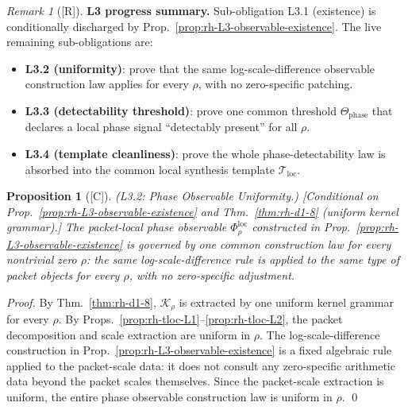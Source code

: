 \documentclass[12pt,oneside]{amsbook}
\theoremstyle{plain}
\newtheorem{proposition}[theorem]{Proposition}
\theoremstyle{definition}
\theoremstyle{remark}
\newtheorem{remark}[theorem]{Remark}
\newcommand{\status}[1]{\textup{[#1]}}
\begin{document}
\begin{remark}[\status{R}]\label{rem:rh-L3-progress}
\textbf{L3 progress summary.}
Sub-obligation L3.1 (existence) is conditionally discharged by
Prop.~\ref{prop:rh-L3-observable-existence}. The live remaining
sub-obligations are:
\begin{itemize}
 \item \textbf{L3.2 (uniformity)}: prove that the same
 log-scale-difference observable construction law applies for
 every $\rho$, with no zero-specific patching.
 \item \textbf{L3.3 (detectability threshold)}: prove one common
 threshold $\Theta_{\mathrm{phase}}$ that declares a local phase
 signal ``detectably present'' for all $\rho$.
 \item \textbf{L3.4 (template cleanliness)}: prove the whole
 phase-detectability law is absorbed into the common local
 synthesis template $\mathcal{T}_{\mathrm{loc}}$.
\end{itemize}
\end{remark}

\begin{proposition}[\status{C}]\label{prop:rh-L3-uniformity}
\textup{(L3.2: Phase Observable Uniformity.)}
\textup{[Conditional on Prop.~\ref{prop:rh-L3-observable-existence}
and Thm.~\ref{thm:rh-d1-8} (uniform kernel grammar).]}
The packet-local phase observable $\Phi_\rho^{\mathrm{loc}}$
constructed in Prop.~\ref{prop:rh-L3-observable-existence} is
governed by one common construction law for every nontrivial zero
$\rho$: the same log-scale-difference rule is applied to the same
type of packet objects for every $\rho$, with no zero-specific
adjustment.
\end{proposition}

\begin{proof}
By Thm.~\ref{thm:rh-d1-8}, $\mathcal{K}_\rho$ is extracted by one
uniform kernel grammar for every $\rho$. By
Props.~\ref{prop:rh-tloc-L1}--\ref{prop:rh-tloc-L2}, the packet
decomposition and scale extraction are uniform in $\rho$.
The log-scale-difference construction in
Prop.~\ref{prop:rh-L3-observable-existence} is a fixed algebraic
rule applied to the packet-scale data: it does not consult any
zero-specific arithmetic data beyond the packet scales themselves.
Since the packet-scale extraction is uniform, the entire phase
observable construction law is uniform in $\rho$. \qed
\end{proof}
\end{document}
